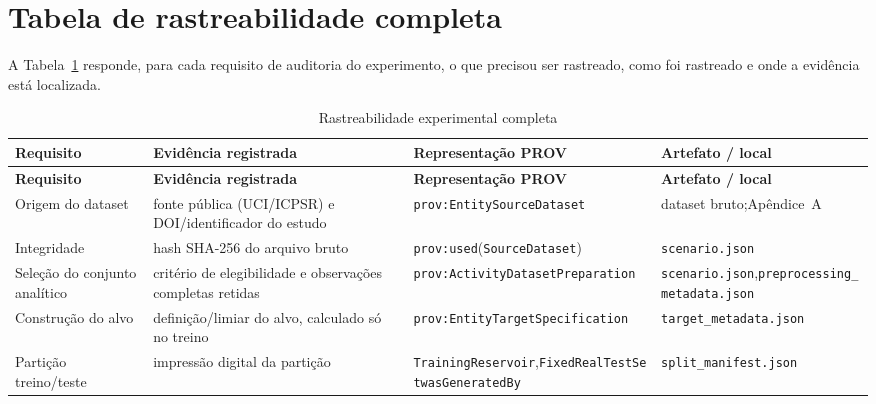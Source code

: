 \section{Tabela de rastreabilidade completa}
\label{sec:tabela-rastreabilidade}

A Tabela~\ref{tab:traceability} responde, para cada requisito de auditoria do experimento, o que precisou ser rastreado, como foi rastreado e onde a evidência está localizada.

\begin{footnotesize}
\begin{longtable}{>{\raggedright\arraybackslash}p{2.6cm}>{\raggedright\arraybackslash}p{4.0cm}>{\raggedright\arraybackslash}p{4.4cm}>{\raggedright\arraybackslash}p{3.4cm}}
\caption{Rastreabilidade experimental completa}\label{tab:traceability}\\
\toprule
\textbf{Requisito} & \textbf{Evidência registrada} & \textbf{Representação PROV} & \textbf{Artefato / local} \\
\midrule
\endfirsthead
\toprule
\textbf{Requisito} & \textbf{Evidência registrada} & \textbf{Representação PROV} & \textbf{Artefato / local} \\
\midrule
\endhead
Origem do dataset & fonte pública (UCI/ICPSR) e DOI/identificador do estudo & \texttt{prov:Entity}\newline\texttt{SourceDataset} & dataset bruto;\newline Apêndice~A \\
\addlinespace
Integridade & hash SHA-256 do arquivo bruto & \texttt{prov:used}\newline(\texttt{SourceDataset}) & \texttt{scenario.json} \\
\addlinespace
Seleção do conjunto analítico & critério de elegibilidade e observações completas retidas & \texttt{prov:Activity}\newline\texttt{DatasetPreparation} & \texttt{scenario.json},\newline\texttt{preprocessing\_}\newline\texttt{metadata.json} \\
\addlinespace
Construção do alvo & definição/limiar do alvo, calculado só no treino & \texttt{prov:Entity}\newline\texttt{TargetSpecification} & \texttt{target\_}\newline\texttt{metadata.json} \\
\addlinespace
Partição treino/teste & impressão digital da partição & \texttt{TrainingReservoir},\newline\texttt{FixedRealTestSet}\newline\texttt{wasGeneratedBy} & \texttt{split\_}\newline\texttt{manifest.json} \\

\end{longtable}
\end{footnotesize}

